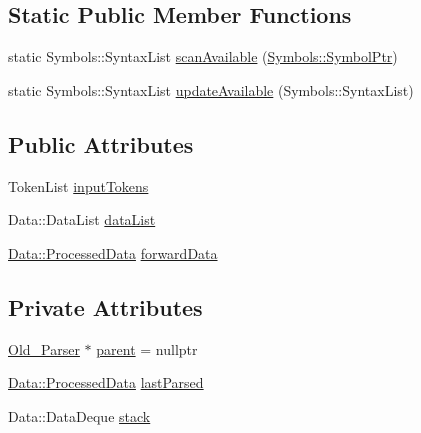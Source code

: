 \subsection*{Static Public Member Functions}
\begin{DoxyCompactItemize}
\item 
static Symbols\+::\+Syntax\+List \mbox{\hyperlink{class_erable_1_1_compiler_1_1_old___parser_ab0f475bddc9180e53ceb540f5e79fe48}{scan\+Available}} (\mbox{\hyperlink{namespace_erable_1_1_compiler_1_1_symbols_a8f0bc762f448ea4d84e8713ab3e140b9}{Symbols\+::\+Symbol\+Ptr}})
\item 
static Symbols\+::\+Syntax\+List \mbox{\hyperlink{class_erable_1_1_compiler_1_1_old___parser_a13282e8f2853da91ca8eaba83d5d6791}{update\+Available}} (Symbols\+::\+Syntax\+List)
\end{DoxyCompactItemize}
\subsection*{Public Attributes}
\begin{DoxyCompactItemize}
\item 
Token\+List \mbox{\hyperlink{class_erable_1_1_compiler_1_1_old___parser_ae6ba8138c01225a6f91445bd9a331b3d}{input\+Tokens}}
\item 
Data\+::\+Data\+List \mbox{\hyperlink{class_erable_1_1_compiler_1_1_old___parser_af4b24149c33f8eab9411c8e1f28bd762}{data\+List}}
\item 
\mbox{\hyperlink{struct_erable_1_1_compiler_1_1_data_1_1_processed_data}{Data\+::\+Processed\+Data}} \mbox{\hyperlink{class_erable_1_1_compiler_1_1_old___parser_a6d914ac6d9915b2858d42522e57d0b0c}{forward\+Data}}
\end{DoxyCompactItemize}
\subsection*{Private Attributes}
\begin{DoxyCompactItemize}
\item 
\mbox{\hyperlink{class_erable_1_1_compiler_1_1_old___parser}{Old\+\_\+\+Parser}} $\ast$ \mbox{\hyperlink{class_erable_1_1_compiler_1_1_old___parser_a8295ed96c8f71b828024e97fe0da88aa}{parent}} = nullptr
\item 
\mbox{\hyperlink{struct_erable_1_1_compiler_1_1_data_1_1_processed_data}{Data\+::\+Processed\+Data}} \mbox{\hyperlink{class_erable_1_1_compiler_1_1_old___parser_a59f98b202f375921888a1cb79bba9842}{last\+Parsed}}
\item 
Data\+::\+Data\+Deque \mbox{\hyperlink{class_erable_1_1_compiler_1_1_old___parser_aa739607e8e8a9aa93aba91a0719ca17e}{stack}}
\end{DoxyCompactItemize}


